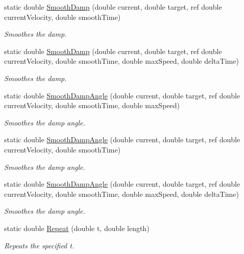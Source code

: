 \begin{DoxyCompactItemize}
static double \hyperlink{struct_unity_engine_1_1_mathd_a8c0a7da037a5aa751468daed146fbb22}{Smooth\+Damp} (double current, double target, ref double current\+Velocity, double smooth\+Time)
\begin{DoxyCompactList}\small\item\em Smoothes the damp. \end{DoxyCompactList}\item 
static double \hyperlink{struct_unity_engine_1_1_mathd_a9885fdb298592c5c6d8e27517926488b}{Smooth\+Damp} (double current, double target, ref double current\+Velocity, double smooth\+Time, double max\+Speed, double delta\+Time)
\begin{DoxyCompactList}\small\item\em Smoothes the damp. \end{DoxyCompactList}\item 
static double \hyperlink{struct_unity_engine_1_1_mathd_ae20d85518eddcc7a4596d8c0cab3c212}{Smooth\+Damp\+Angle} (double current, double target, ref double current\+Velocity, double smooth\+Time, double max\+Speed)
\begin{DoxyCompactList}\small\item\em Smoothes the damp angle. \end{DoxyCompactList}\item 
static double \hyperlink{struct_unity_engine_1_1_mathd_adda99bdc59e4d807358dc353e11c0213}{Smooth\+Damp\+Angle} (double current, double target, ref double current\+Velocity, double smooth\+Time)
\begin{DoxyCompactList}\small\item\em Smoothes the damp angle. \end{DoxyCompactList}\item 
static double \hyperlink{struct_unity_engine_1_1_mathd_a393518101cb87230714b5025618358e6}{Smooth\+Damp\+Angle} (double current, double target, ref double current\+Velocity, double smooth\+Time, double max\+Speed, double delta\+Time)
\begin{DoxyCompactList}\small\item\em Smoothes the damp angle. \end{DoxyCompactList}\item 
static double \hyperlink{struct_unity_engine_1_1_mathd_a699d48b8c58b6b1b171a2d5bdc9f7ea0}{Repeat} (double t, double length)
\begin{DoxyCompactList}\small\item\em Repeats the specified t. \end{DoxyCompactList}\item 

\end{DoxyCompactItemize}
